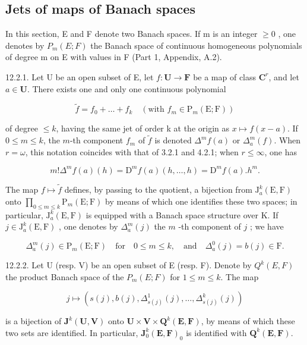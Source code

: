 \subsection{Jets of maps of Banach spaces}

In this section, E and F denote two Banach spaces. If m is an integer \(\geqslant0\) , one denotes by \(P_{m}(E;F)\) the Banach space of continuous homogeneous polynomials of degree m on E with values in F (Part 1, Appendix, A.2).

12.2.1. Let U be an open subset of E, let \(f\colon\mathbf{U}\to\mathbf{F}\) be a map of class \(\mathbf{C}^{r}\), and let \(a\in\mathbf{U}\). There exists one and only one continuous polynomial

\[
\tilde {f} = f _ {0} + \dots + f _ {k} \quad (\text{with }f _ {m} \in \mathrm{P} _ {m} (\mathrm{E}; \mathrm{F}))
\]

of degree \(\leqslant k\), having the same jet of order k at the origin as \(x \mapsto f(x - a)\). If \(0 \leqslant m \leqslant k\), the \(m\)-th component \(f_m\) of \(\tilde{f}\) is denoted \(\Delta^m f(a)\) or \(\Delta_a^m(f)\). When \(r = \omega\), this notation coincides with that of 3.2.1 and 4.2.1; when \(r \leqslant \infty\), one has

\[
m! \Delta^ {m} f (a) (h) = \mathrm{D} ^ {m} f (a) (h, \dots , h) = \mathrm{D} ^ {m} f (a). h ^ {m}.
\]

The map \(f\mapsto\tilde{f}\) defines, by passing to the quotient, a bijection from \(\mathrm{J}_{a}^{k}(\mathrm{E},\mathrm{F})\) onto \(\prod_{0\leqslant m\leqslant k}\mathrm{P}_{m}(\mathrm{E};\mathrm{F})\) by means of which one identifies these two spaces; in particular, \(\mathrm{J}_{a}^{k}(\mathrm{E},\mathrm{F})\) is equipped with a Banach space structure over K. If \(j\in\mathrm{J}_{a}^{k}(\mathrm{E},\mathrm{F})\) , one denotes by \(\Delta_{a}^{m}(j)\) the \(m\) -th component of \(j\) ; we have

\[
\Delta_ {a} ^ {m} (j) \in \mathrm{P} _ {m} (\mathrm{E}; \mathrm{F}) \quad \text {for} \quad 0 \leqslant m \leqslant k, \quad \text {and} \quad \Delta_ {a} ^ {0} (j) = b (j) \in \mathrm{F}.
\]

12.2.2. Let U (resp. V) be an open subset of E (resp. F). Denote by \(Q^{k}(E, F)\) the product Banach space of the \(P_{m}(E; F)\) for \(1 \leqslant m \leqslant k\). The map

\[
j \mapsto (s (j), b (j), \Delta_ {s (j)} ^ {1} (j), \dots , \Delta_ {s (j)} ^ {k} (j))
\]

is a bijection of \(\mathbf{J}^{k}(\mathbf{U},\mathbf{V})\) onto \(\mathbf{U}\times\mathbf{V}\times\mathbf{Q}^{k}(\mathbf{E},\mathbf{F})\), by means of which these two sets are identified. In particular, \(\mathbf{J}_{0}^{k}(\mathbf{E},\mathbf{F})_{0}\) is identified with \(\mathbf{Q}^{k}(\mathbf{E},\mathbf{F})\).


